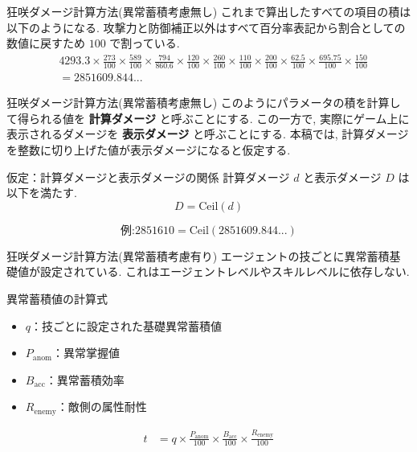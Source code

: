 \documentclass[aspectratio=169]{beamer}
\newcommand{\ceil}[1]{\mathrm{Ceil}\!\left(#1\right)}
\begin{document}

\begin{frame}{狂咲ダメージ計算方法(異常蓄積考慮無し)}
これまで算出したすべての項目の積は以下のようになる.
攻撃力と防御補正以外はすべて百分率表記から割合としての数値に戻すため $100$ で割っている.
\[
\begin{aligned}
&4293.3
\times
\frac{273}{100}
\times
\frac{589}{100}
\times
\frac{794}{860.6}
\times
\frac{120}{100}
\times
\frac{260}{100}
\times
\frac{110}{100}
\times
\frac{200}{100}
\times
\frac{62.5}{100}
\times
\frac{695.75}{100}
\times
\frac{150}{100}
\\
&=
2851609.844...
\end{aligned}
\]
\end{frame}

\begin{frame}{狂咲ダメージ計算方法(異常蓄積考慮無し)}
このようにパラメータの積を計算して得られる値を \textbf{計算ダメージ} と呼ぶことにする.
この一方で, 実際にゲーム上に表示されるダメージを \textbf{表示ダメージ} と呼ぶことにする.  
本稿では, 計算ダメージを整数に切り上げた値が表示ダメージになると仮定する.
\begin{block}{仮定：計算ダメージと表示ダメージの関係}
計算ダメージ $d$ と表示ダメージ $D$ は以下を満たす.
\[
  D = \ceil{d}
\]
\end{block}
\[
  \text{例:} 2851610 = \ceil{2851609.844...}
\]
\end{frame}

\begin{frame}{狂咲ダメージ計算方法(異常蓄積考慮有り)}
エージェントの技ごとに異常蓄積基礎値が設定されている. 
これはエージェントレベルやスキルレベルに依存しない.
\begin{block}{異常蓄積値の計算式}
\small
\begin{itemize}
  \item $q$：技ごとに設定された基礎異常蓄積値
  \item $P_{\mathrm{anom}}$：異常掌握値
  \item $B_{\mathrm{acc}}$：異常蓄積効率
  \item $R_{\mathrm{enemy}}$：敵側の属性耐性
\end{itemize}
\[
\begin{aligned}
t
&=
q
\times
\frac{P_{\mathrm{anom}}}{100}
\times
\frac{B_{\mathrm{acc}}}{100}
\times
\frac{R_{\mathrm{enemy}}}{100}
\end{aligned}
\]
\end{block}
\end{frame}
\end{document}
